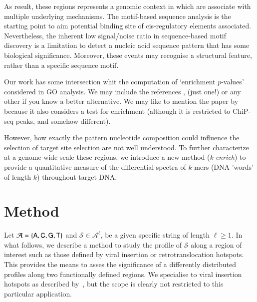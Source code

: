 \documentclass{bioinfo}
\begin{document}
As result, these regions represents a genomic context in which are
associate with multiple underlying mechanisms. The motif-based
sequence analysis is the starting point to aim potential binding site
of cis-regulatory elements associated. Nevertheless, the inherent low
signal/noise ratio in sequence-based motif discovery is a limitation
to detect a nucleic acid sequence pattern that has some biological
significance. Moreover, these events may recognise a structural
feature, rather than a specific sequence motif. 


Our work has some intersection whit the computation of `enrichment
$p$-values' considered in  GO analysis. We may include the references
\cite{HSL}, \cite{RPTP} (just one!) or any other if you know a better
alternative. We may like to mention the paper by \cite{BM} because it
also considers a test for enrichment (although it is restricted to
ChiP-seq peaks, and somehow different). 

However, how exactly the pattern nucleotide composition could
influence the selection of target site selection are not well
understood. To further characterize at a genome-wide scale these
regions, we introduce a new method ({\it k-enrich}) to provide a
quantitative measure of the differential spectra of $k$-mers (DNA
'words' of length $k$) throughout target DNA. 


\section{Method}
Let $\mathcal A = \{\sf A, C, G, T\}$ and $\mathcal S \in \mathcal
A^\ell$, be a given specific string of length $\ell\geq
1$. %
In what follows, we describe a method to study the profile of
$\mathcal S$ along a region of interest such as those defined by viral
insertion or retrotranslocation hotspots. This provides the means to
asses the significance of a differently distributed profiles along two
functionally defined regions. We specialise to viral insertion
hotspots as described by~\cite{IRAMM}, but the scope is clearly not
restricted to this particular application.  
\end{document}
